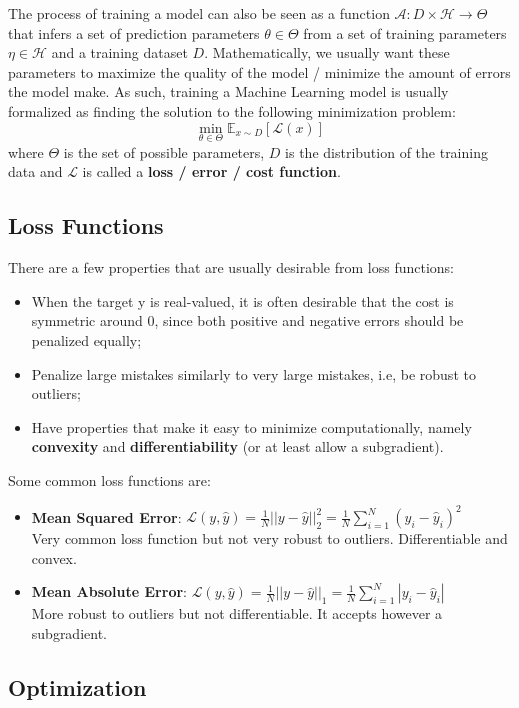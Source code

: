 \documentclass{article}
\newcommand{\E}{\mathbb{E}}
\newcommand{\loss}{\mathcal{L}}
\begin{document}
The process of training a model can also be seen as a function $\mathcal{A} : D \times \mathcal{H} \to \Theta$ that infers a set of prediction parameters $\theta \in \Theta$ from a set of training parameters $\eta \in \mathcal{H}$ and a training dataset $D$.
Mathematically, we usually want these parameters to maximize the quality of the model / minimize the amount of errors the model make.
As such, training a Machine Learning model is usually formalized as finding the solution to  the following minimization problem:
$$
\min_{\theta \in \Theta} \E_{x \sim D} \left[ \loss(x) \right]
$$
where $\Theta$ is the set of possible parameters, $D$ is the distribution of the training data and $\loss$ is called a \textbf{loss / error / cost function}.

\subsection{Loss Functions}

There are a few properties that are usually desirable from loss functions:
\begin{itemize}
    \item When the target y is real-valued, it is often desirable that the cost is symmetric around 0, since both positive and negative errors should be penalized equally;
    \item Penalize large mistakes similarly to very large mistakes, i.e, be robust to outliers;
    \item Have properties that make it easy to minimize computationally, namely \textbf{convexity} and \textbf{differentiability} (or at least allow a subgradient).
\end{itemize}

Some common loss functions are:
\begin{itemize}
    \item \textbf{Mean Squared Error}: 
	$\loss(y, \hat{y}) = \frac{1}{N} ||y - \hat{y}||_2^2 = \frac{1}{N} \sum_{i=1}^N (y_i - \hat{y}_i)^2$\\
	Very common loss function but not very robust to outliers. Differentiable and convex.
    \item \textbf{Mean Absolute Error}: 
	$\loss(y, \hat{y}) = \frac{1}{N} ||y - \hat{y}||_1 = \frac{1}{N} \sum_{i=1}^N |y_i - \hat{y}_i|$\\
	More robust to outliers but not differentiable. It accepts however a subgradient.
\end{itemize}

\subsection{Optimization}
\end{document}
